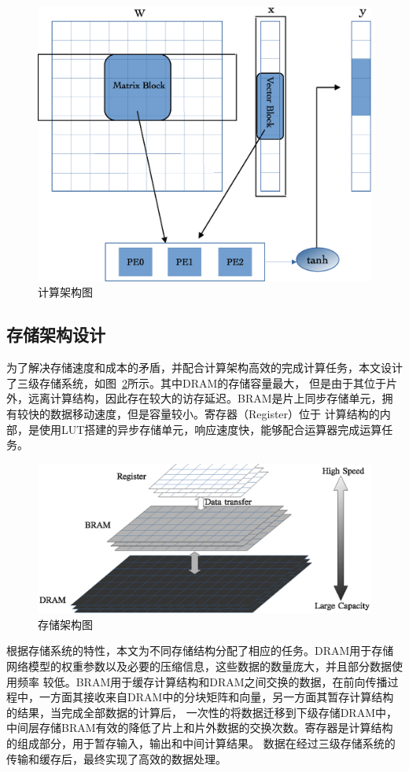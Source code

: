 




\begin{figure}[htbp]
	\centering
	\includegraphics[width=0.6\columnwidth]{exp/fig_compute.eps}
	\caption{计算架构图}
	\label{fig:compute}
\end{figure}


\subsection{存储架构设计}
为了解决存储速度和成本的矛盾，并配合计算架构高效的完成计算任务，本文设计了三级存储系统，如图~\ref{fig:memory}所示。其中DRAM的存储容量最大，
但是由于其位于片外，远离计算结构，因此存在较大的访存延迟。BRAM是片上同步存储单元，拥有较快的数据移动速度，但是容量较小。寄存器（Register）位于
计算结构的内部，是使用LUT搭建的异步存储单元，响应速度快，能够配合运算器完成运算任务。

\begin{figure}[htbp]
	\centering
	\includegraphics[width=0.7\columnwidth]{exp/fig_memory.eps}
	\caption{存储架构图}
	\label{fig:memory}
\end{figure}

根据存储系统的特性，本文为不同存储结构分配了相应的任务。DRAM用于存储网络模型的权重参数以及必要的压缩信息，这些数据的数量庞大，并且部分数据使用频率
较低。BRAM用于缓存计算结构和DRAM之间交换的数据，在前向传播过程中，一方面其接收来自DRAM中的分块矩阵和向量，另一方面其暂存计算结构的结果，当完成全部数据的计算后，
一次性的将数据迁移到下级存储DRAM中，中间层存储BRAM有效的降低了片上和片外数据的交换次数。寄存器是计算结构的组成部分，用于暂存输入，输出和中间计算结果。
数据在经过三级存储系统的传输和缓存后，最终实现了高效的数据处理。
